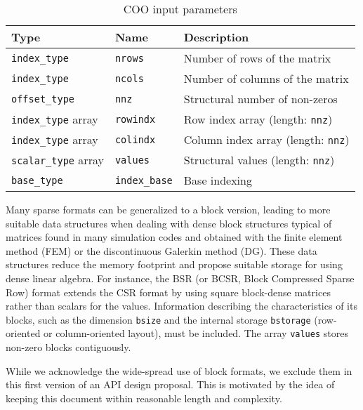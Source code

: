 \documentclass{article}
\begin{document}

\begin{table}[htbp]
\scriptsize
\begin{center}
     \begin{tabular}{l l l}
         \toprule
         \textbf{Type}      & \textbf{Name} & \textbf{Description} \\
         \midrule
         \texttt{index\_type} & \texttt{nrows} & Number of rows of the matrix \\
         \texttt{index\_type} & \texttt{ncols} & Number of columns of the matrix \\
         \texttt{offset\_type} & \texttt{nnz} & Structural number of non-zeros \\
         \texttt{index\_type} array & \texttt{rowindx} & Row index array (length: \texttt{nnz}) \\
         \texttt{index\_type} array & \texttt{colindx} & Column index array (length: \texttt{nnz}) \\
         \texttt{scalar\_type} array & \texttt{values} & Structural values (length: \texttt{nnz}) \\
         \texttt{base\_type} & \texttt{index\_base} & Base indexing\\
         \bottomrule
     \end{tabular}
\end{center}
     \caption{COO input parameters}
    \label{tab:coo_param}
\end{table}

Many sparse formats can be generalized to a block version, leading to more suitable data structures when dealing with dense block structures typical of matrices found in many simulation codes and obtained with the finite element method (FEM) or the discontinuous Galerkin method (DG). These data structures reduce the memory footprint and propose suitable storage for using dense linear algebra.  
For instance, the BSR (or BCSR, Block Compressed Sparse Row) format extends the CSR format by using square block-dense matrices rather than scalars for the values. Information describing the characteristics of its blocks, such as the dimension \texttt{bsize} and the internal storage \texttt{bstorage} (row-oriented or column-oriented layout), must be included. The array \texttt{values} stores non-zero blocks contiguously.

While we acknowledge the wide-spread use of block formats, we exclude them in this first version of an API design proposal. This is motivated by the idea of keeping this document within reasonable length and complexity.
\end{document}
